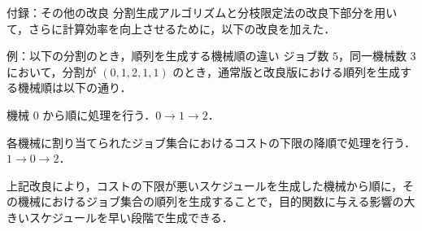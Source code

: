 \documentclass[dvipdfmx]{beamer}
\begin{document}
    \begin{frame}{付録：その他の改良}
      分割生成アルゴリズムと分枝限定法の改良下部分を用いて，さらに計算効率を向上させるために，以下の改良を加えた．
      \begin{exampleblock}{例：以下の分割のとき，順列を生成する機械順の違い}
        ジョブ数 $5$，同一機械数 $3$ において，分割が $(0,1,2,1,1)$ のとき，通常版と改良版における順列を生成する機械順は以下の通り．
        \begin{description}
          \setlength{\leftskip}{-8mm}
          \item[通常版 ] 機械 $0$ から順に処理を行う．$0 \to 1 \to 2$．
          \item[改良版 ] 各機械に割り当てられたジョブ集合におけるコストの下限の降順で処理を行う．$1 \to 0 \to 2$．
        \end{description}
      \end{exampleblock}
      \begin{block}{}
        上記改良により，コストの下限が悪いスケジュールを生成した機械から順に，その機械におけるジョブ集合の順列を生成することで，目的関数に与える影響の大きいスケジュールを早い段階で生成できる．
      \end{block}
    \end{frame}
\end{document}
